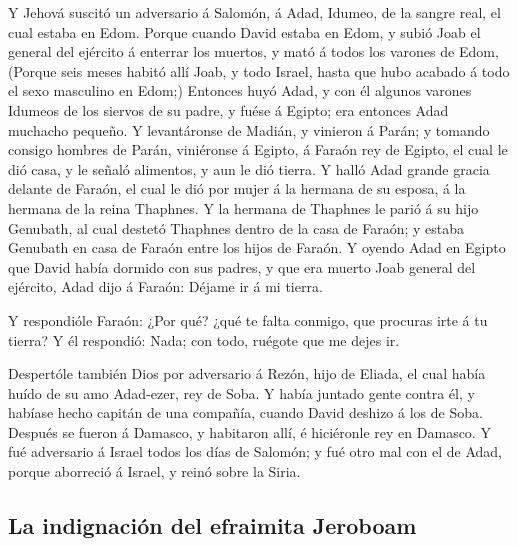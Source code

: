  Y Jehová suscitó un adversario á Salomón, á Adad, Idumeo,
de la sangre real, el cual estaba en Edom.  Porque cuando
David estaba en Edom, y subió Joab el general del ejército á enterrar
los muertos, y mató á todos los varones de Edom,  (Porque
seis meses habitó allí Joab, y todo Israel, hasta que hubo acabado á
todo el sexo masculino en Edom;)  Entonces huyó Adad, y con
él algunos varones Idumeos de los siervos de su padre, y fuése á Egipto;
era entonces Adad muchacho pequeño.  Y levantáronse de
Madián, y vinieron á Parán; y tomando consigo hombres de Parán,
viniéronse á Egipto, á Faraón rey de Egipto, el cual le dió casa, y le
señaló alimentos, y aun le dió tierra.  Y halló Adad grande
gracia delante de Faraón, el cual le dió por mujer á la hermana de su
esposa, á la hermana de la reina Thaphnes.  Y la hermana de
Thaphnes le parió á su hijo Genubath, al cual destetó Thaphnes dentro de
la casa de Faraón; y estaba Genubath en casa de Faraón entre los hijos
de Faraón.  Y oyendo Adad en Egipto que David había dormido
con sus padres, y que era muerto Joab general del ejército, Adad dijo á
Faraón: Déjame ir á mi tierra.

 Y respondióle Faraón: ¿Por qué? ¿qué te falta conmigo, que
procuras irte á tu tierra? Y él respondió: Nada; con todo, ruégote que
me dejes ir.

 Despertóle también Dios por adversario á Rezón, hijo de
Eliada, el cual había huído de su amo Adad-ezer, rey de Soba.
 Y había juntado gente contra él, y habíase hecho capitán
de una compañía, cuando David deshizo á los de Soba. Después se fueron á
Damasco, y habitaron allí, é hiciéronle rey en Damasco.  Y
fué adversario á Israel todos los días de Salomón; y fué otro mal con el
de Adad, porque aborreció á Israel, y reinó sobre la Siria.

\hypertarget{la-indignaciuxf3n-del-efraimita-jeroboam}{%
\subsection{La indignación del efraimita
Jeroboam}\label{la-indignaciuxf3n-del-efraimita-jeroboam}}

